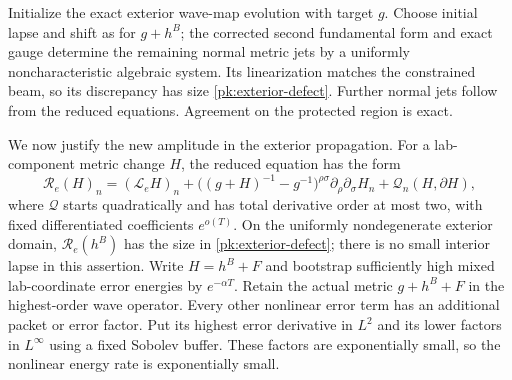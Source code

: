 Initialize the exact exterior wave-map evolution with target $g$.
Choose initial lapse and shift as for $g+h^B$; the corrected second
fundamental form and exact gauge determine the remaining normal
metric jets by a uniformly noncharacteristic algebraic system.
Its linearization matches the constrained beam, so its discrepancy
has size \eqref{pk:exterior-defect}. Further normal jets follow
from the reduced equations. Agreement on the protected region is
exact.

We now justify the new amplitude in the exterior propagation.
For a lab-component metric change $H$, the reduced equation has
the form
\begin{equation}\label{pk:exterior-operator}
 \mathcal R_e(H)_n=(\mathcal L_eH)_n+
 \bigl((g+H)^{-1}-g^{-1}\bigr)^{\rho\sigma}
       \partial_\rho\partial_\sigma H_n+
 \mathcal Q_n(H,\partial H),
\end{equation}
where $\mathcal Q$ starts quadratically and has total derivative
order at most two, with fixed differentiated coefficients
$e^{o(T)}$. On the uniformly nondegenerate exterior domain,
$\mathcal R_e(h^B)$ has the size in
\eqref{pk:exterior-defect}; there is no small interior lapse in
this assertion. Write $H=h^B+F$ and bootstrap sufficiently high
mixed lab-coordinate error energies by $e^{-\alpha T}$.
Retain the actual metric $g+h^B+F$ in the highest-order wave
operator. Every other nonlinear error term has an additional
packet or error factor. Put its highest error derivative in
$L^2$ and its lower factors in $L^\infty$ using a fixed Sobolev
buffer. These factors are exponentially small, so the nonlinear
energy rate is exponentially small.

